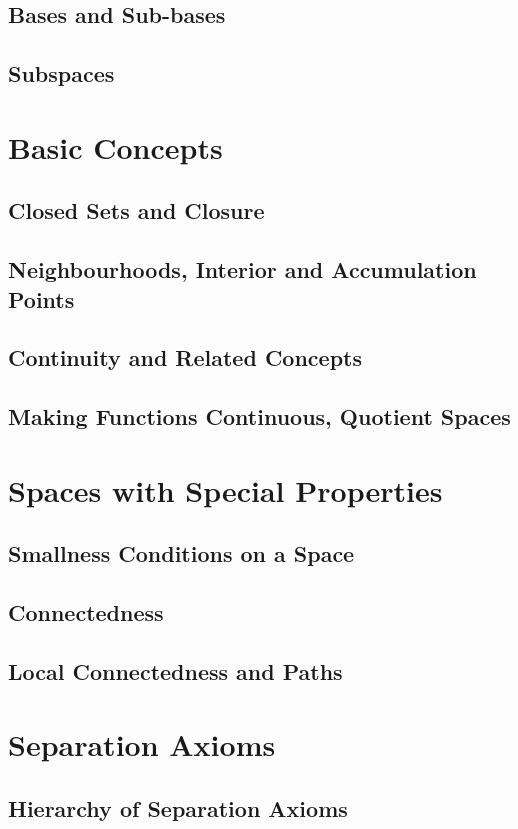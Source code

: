 \section{Bases and Sub-bases}
\section{Subspaces}

\chapter{Basic Concepts}
\section{Closed Sets and Closure}
\section{Neighbourhoods, Interior and Accumulation Points}
\section{Continuity and Related Concepts}
\section{Making Functions Continuous, Quotient Spaces}

\chapter{Spaces with Special Properties}
\section{Smallness Conditions on a Space}
\section{Connectedness}
\section{Local Connectedness and Paths}

\chapter{Separation Axioms}
\section{Hierarchy of Separation Axioms}
